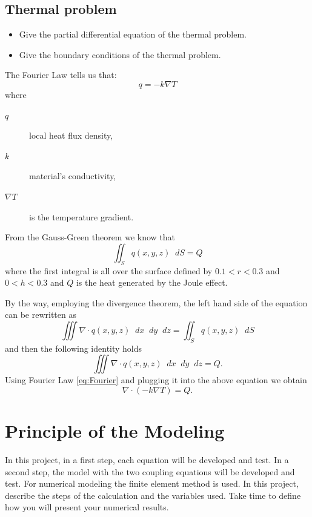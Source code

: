 \documentclass{article}
\newcommand{\diff}{\mathop{}\!d}
\begin{document}
\subsection{Thermal problem}
\begin{itemize}
	\item Give the partial differential equation of the thermal problem.
	\item Give the boundary conditions of the thermal problem.
\end{itemize}
\begin{mdframed}
	The Fourier Law tells us that:
	\begin{equation}
	\label{eq:Fourier}
	q=-k\nabla T
	\end{equation}
	where
	\begin{description}
		\item[$ q$] local heat flux density,
		\item[$ k $] material's conductivity,
		\item[$ \nabla T $] is the temperature gradient. 
	\end{description}
	From the Gauss-Green theorem we know that 
	\[
	\iint_S q(x,y,z) \diff S=Q
	\]
	where the first integral is all over the surface defined by $ 0.1<r<0.3 $ and $ 0<h<0.3 $ and $ Q $ is the heat generated by the Joule effect.
	
	By the way, employing the divergence theorem, the left hand side of the equation can be rewritten as  
	\[ \iiint \nabla\cdot q(x,y,z) \diff x\diff y\diff z = \iint_S q(x,y,z) \diff S  \]
	and then the following identity holds
	\begin{equation}
	\iiint \nabla\cdot q(x,y,z) \diff x\diff y\diff z = Q.
	\end{equation}
	Using Fourier Law \eqref{eq:Fourier} and plugging it into the above equation we obtain
	\begin{equation}
	\nabla\cdot(-k\nabla T)=Q.
	\end{equation}
\end{mdframed}

	
\section{Principle of the Modeling}
\begin{mdframed}
	In this project, in a first step, each equation will be developed and test. In a second step, the model with the
	two coupling equations will be developed and test. For numerical modeling the finite element method is
	used. In this project, describe the steps of the calculation and the variables used. Take time to define how you
	will present your numerical results.
\end{mdframed}
\end{document}
